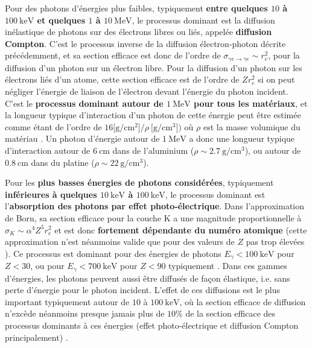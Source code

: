 \begin{refsection}
Pour des photons d'énergies plus faibles, typiquement \textbf{entre quelques $10$ à $100 ~ \si{\keV}$ et quelques $1$ à $10 ~ \si{\MeV}$}, le processus dominant est la diffusion inélastique de photons sur des électrons libres ou liés, appelée \textbf{diffusion Compton}. C'est le processus inverse de la diffusion électron-photon décrite précédemment, et sa section efficace est donc de l'ordre de $\sigma_{\gamma e \to \gamma e} \sim r_e^2$, pour la diffusion d'un photon sur un électron libre. Pour la diffusion d'un photon sur les électrons liés d'un atome, cette section efficace est de l'ordre de $Z r_e^2$ si on peut négliger l'énergie de liaison de l'électron devant l'énergie du photon incident. C'est le \textbf{processus dominant autour de $1 ~ \si{\MeV}$ pour tous les matériaux}, et la longueur typique d'interaction d'un photon de cette énergie peut être estimée comme étant de l'ordre de $16 \si{[\g\per\cm^2]} / \rho ~ \si{[\g \per \cm^3]})$ où $\rho$ est la masse volumique du matériau \parencite{carron_2007}. Un photon d'énergie autour de $1 ~ \si{\MeV}$ a donc une longueur typique d'interaction autour de $6 ~ \si{\cm}$ dans de l'aluminium ($\rho \sim 2.7 ~ \si{\g \per \cm^3}$), ou autour de $0.8 ~ \si{\cm}$ dans du platine ($\rho \sim 22 ~ \si{\g \per \cm^3}$).

Pour les \textbf{plus basses énergies de photons considérées}, typiquement \textbf{inférieures à quelques $10 ~ \si{\keV}$ à $100 ~ \si{\keV}$}, le processus dominant est l'\textbf{absorption des photons par effet photo-électrique}. Dans l'approximation de Born, sa section efficace pour la couche K a une magnitude proportionnelle \parencite{carron_2007} à $\sigma_K \sim \alpha^4 Z^5 r_e^2$ et est donc \textbf{fortement dépendante du numéro atomique} (cette approximation n'est néanmoins valide que pour des valeurs de $Z$ pas trop élevées \parencite{carron_2007}). Ce processus est dominant pour des énergies de photons $E_\gamma<100 ~ \si{\keV}$ pour $Z<30$, ou pour $E_\gamma<700 ~ \si{\keV}$ pour $Z<90$ typiquement \parencite{carron_2007}. Dans ces gammes d'énergies, les photons peuvent aussi être diffusés de façon élastique, i.e. sans perte d'énergie pour le photon incident. L'effet de ces diffusions est le plus important typiquement autour de $10$ à $100 ~ \si{\keV}$, où la section efficace de diffusion n'excède néanmoins presque jamais plus de $10\%$ de la section efficace des processus dominants à ces énergies (effet photo-électrique et diffusion Compton principalement) \parencite{carron_2007}. 




\end{refsection}
